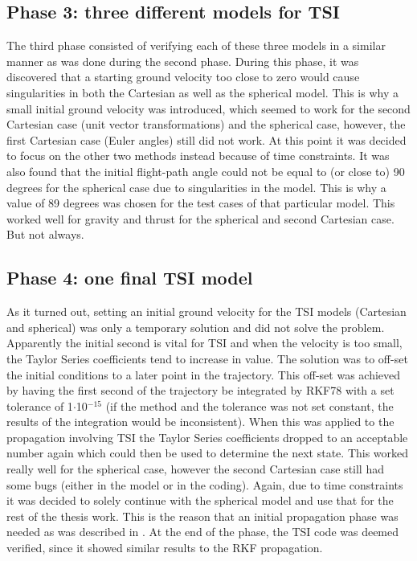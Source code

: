 \subsection{Phase 3: three different models for \ac{TSI}}
\label{subsec:phase3com}
The third phase consisted of verifying each of these three models in a similar manner as was done during the second phase. During this phase, it was discovered that a starting ground velocity too close to zero would cause singularities in both the Cartesian as well as the spherical model. This is why a small initial ground velocity was introduced, which seemed to work for the second Cartesian case (unit vector transformations) and the spherical case, however, the first Cartesian case (Euler angles) still did not work. At this point it was decided to focus on the other two methods instead because of time constraints. It was also found that the initial flight-path angle could not be equal to (or close to) 90 degrees for the spherical case due to singularities in the model. This is why a value of 89 degrees was chosen for the test cases of that particular model. This worked well for gravity and thrust for the spherical and second Cartesian case. But not always.

\subsection{Phase 4: one final \ac{TSI} model}
\label{subsec:phase4com}
As it turned out, setting an initial ground velocity for the \ac{TSI} models (Cartesian and spherical) was only a temporary solution and did not solve the problem. Apparently the initial second is vital for \ac{TSI} and when the velocity is too small, the Taylor Series coefficients tend to increase in value. The solution was to off-set the initial conditions to a later point in the trajectory. This off-set was achieved by having the first second of the trajectory be integrated by \ac{RKF78} with a set tolerance of 1$\cdot$10$^{-15}$ (if the method and the tolerance was not set constant, the results of the integration would be inconsistent). When this was applied to the propagation involving \ac{TSI} the Taylor Series coefficients dropped to an acceptable number again which could then be used to determine the next state. This worked really well for the spherical case, however the second Cartesian case still had some bugs (either in the model or in the coding). Again, due to time constraints it was decided to solely continue with the spherical model and use that for the rest of the thesis work. This is the reason that an initial propagation phase was needed as was described in . At the end of the phase, the \ac{TSI} code was deemed verified, since it showed similar results to the \ac{RKF} propagation. 

